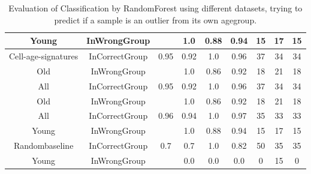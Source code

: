 \begin{table}[H]
\begin{tabular}{|c|c|c|c|c|c|c|c|c|}
		Young & InWrongGroup &   & 1.0 & 0.88 & 0.94 & 15 & 17 & 15 \\
		\hline
		Cell-age-signatures & InCorrectGroup & 0.95 & 0.92 & 1.0 & 0.96 & 37 & 34 & 34 \\
		Old & InWrongGroup &   & 1.0 & 0.86 & 0.92 & 18 & 21 & 18 \\
		\hline
		\hline
		\rowcolor{gray!20}
		All & InCorrectGroup & 0.95 & 0.92 & 1.0 & 0.96 & 37 & 34 & 34 \\
		\rowcolor{gray!20}
		Old & InWrongGroup &   & 1.0 & 0.86 & 0.92 & 18 & 21 & 18 \\
		\hline
		\rowcolor{gray!20}
		All & InCorrectGroup & 0.96 & 0.94 & 1.0 & 0.97 & 35 & 33 & 33 \\
		\rowcolor{gray!20}
		Young & InWrongGroup &   & 1.0 & 0.88 & 0.94 & 15 & 17 & 15 \\
		\hline
		\hline
		Randombaseline & InCorrectGroup & 0.7 & 0.7 & 1.0 & 0.82 & 50 & 35 & 35 \\
		Young & InWrongGroup &   & 0.0 & 0.0 & 0.0 & 0 & 15 & 0 \\
		\hline
	\end{tabular}
	\caption{Evaluation of Classification by RandomForest using different datasets, trying to predict if a sample is an outlier from its own agegroup.}
	\label{tab:CompareOutliersClassificationRandomForest}
\end{table}
